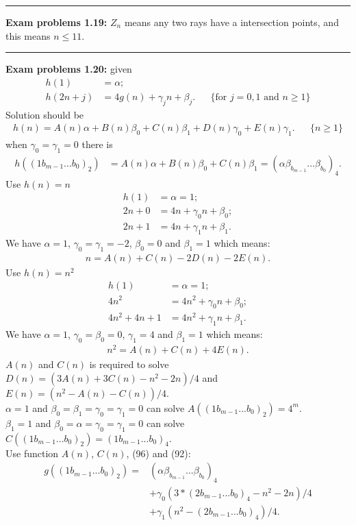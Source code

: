 \documentclass{article}
\begin{document}
\noindent\rule{\textwidth}{0.4pt}
\textbf{Exam problems 1.19:}
$Z_n$ means any two rays have a intersection points, and this means $n \le 11$.

\noindent\rule{\textwidth}{0.4pt}
\textbf{Exam problems 1.20:}
given
\begin{align}
h(1) &= \alpha;\\
h(2n+j) &= 4g(n) + \gamma_j n + \beta_j. && \{\text{for }j=0,1\text{ and }n\ge 1\}
\end{align}
Solution should be
\begin{align}
h(n) = A(n)\alpha + B(n)\beta_0 + C(n)\beta_1 + D(n)\gamma_0 + E(n)\gamma_1. && \{n\ge 1\}
\end{align}
when $\gamma_0 = \gamma_1 = 0$ there is
\begin{align}
h((1b_{m-1}...b_0)_2) &= A(n)\alpha + B(n)\beta_0 + C(n)\beta_1 = (\alpha \beta_{b_{m-1}}...\beta_{b_0})_4.
\end{align}
Use $h(n)=n$
\begin{align}
h(1) &= \alpha = 1;\\
2n+0 &= 4n + \gamma_0 n + \beta_0;\\
2n+1 &= 4n + \gamma_1 n + \beta_1.
\end{align}
We have $\alpha = 1$, $\gamma_0 = \gamma_1 = -2$, $\beta_0 = 0$ and $\beta_1 = 1$ which means:
\begin{align}
n = A(n) + C(n) -2D(n) - 2E(n).
\end{align}
Use $h(n)=n^2$
\begin{align}
h(1) &= \alpha = 1;\\
4n^2 &= 4n^2 + \gamma_0 n + \beta_0;\\
4n^2 + 4n +1 &= 4n^2 + \gamma_1 n + \beta_1.
\end{align}
We have $\alpha = 1$, $\gamma_0 = \beta_0 = 0$, $\gamma_1 = 4$ and $\beta_1 = 1$ which means:
\begin{align}
n^2 = A(n) + C(n) + 4E(n).
\end{align}
$A(n)$ and $C(n)$ is required to solve $D(n) = (3A(n) + 3C(n) - n^2 - 2n)/4$ and $E(n) = (n^2 - A(n) - C(n))/4$.\\
$\alpha = 1$ and $\beta_0 = \beta_1 = \gamma_0 = \gamma_1 = 0$ can solve $A((1b_{m-1}...b_0)_2) = 4^m$.\\
$\beta_1 = 1$ and $\beta_0 = \alpha = \gamma_0 = \gamma_1 = 0$ can solve $C((1b_{m-1}...b_0)_2) = (1b_{m-1}...b_0)_4$.\\
Use function $A(n)$, $C(n)$, (96) and (92):
\begin{align}
g((1b_{m-1}...b_0)_2) =& (\alpha \beta_{b_{m-1}}...\beta_{b_0})_4 \\
			&+ \gamma_0 (3*(2b_{m-1}...b_0)_4 - n^2 - 2n)/4 \\
			&+ \gamma_1 (n^2 - (2b_{m-1}...b_0)_4)/4.
\end{align}
\end{document}
